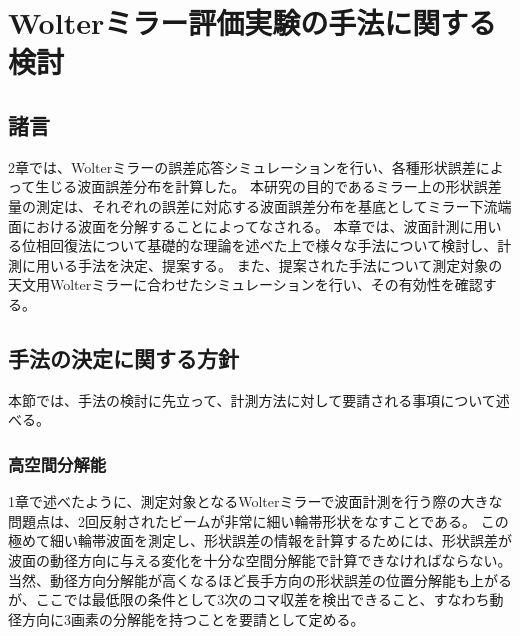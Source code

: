 \chapter{Wolterミラー評価実験の手法に関する検討}
\thispagestyle{empty}
\label{chap3}
\graphicspath{{chap3/figure/}}
\minitoc

\newpage


\section{諸言}
\label{chap3_introduction}

2章では、Wolterミラーの誤差応答シミュレーションを行い、各種形状誤差によって生じる波面誤差分布を計算した。
本研究の目的であるミラー上の形状誤差量の測定は、それぞれの誤差に対応する波面誤差分布を基底としてミラー下流端面における波面を分解することによってなされる。
本章では、波面計測に用いる位相回復法について基礎的な理論を述べた上で様々な手法について検討し、計測に用いる手法を決定、提案する。
また、提案された手法について測定対象の天文用Wolterミラーに合わせたシミュレーションを行い、その有効性を確認する。

\clearpage
\newpage

\section{手法の決定に関する方針}
\label{chap3_method_choice_policy}

本節では、手法の検討に先立って、計測方法に対して要請される事項について述べる。

\subsection{高空間分解能}
\label{chap3_high_spatial_resolution}
1章で述べたように、測定対象となるWolterミラーで波面計測を行う際の大きな問題点は、2回反射されたビームが非常に細い輪帯形状をなすことである。
この極めて細い輪帯波面を測定し、形状誤差の情報を計算するためには、形状誤差が波面の動径方向に与える変化を十分な空間分解能で計算できなければならない。
当然、動径方向分解能が高くなるほど長手方向の形状誤差の位置分解能も上がるが、ここでは最低限の条件として3次のコマ収差を検出できること、すなわち動径方向に3画素の分解能を持つことを要請として定める。

